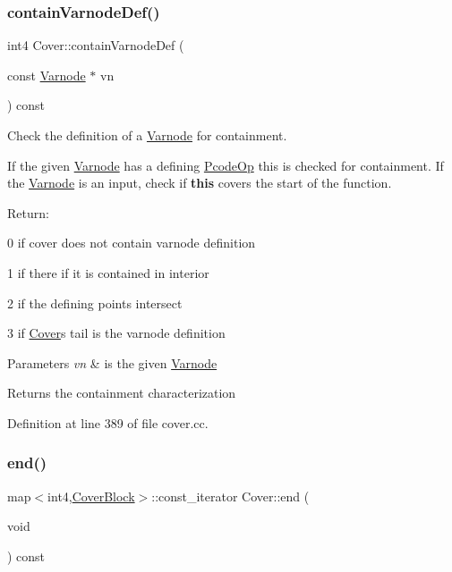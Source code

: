 \mbox{\label{class_cover_a56984085c138cc78b1544590d82fd872}} 
\subsubsection{\texorpdfstring{containVarnodeDef()}{containVarnodeDef()}}
{\footnotesize\ttfamily int4 Cover\+::contain\+Varnode\+Def (\begin{DoxyParamCaption}\item[{const \mbox{\hyperlink{class_varnode}{Varnode}} $\ast$}]{vn }\end{DoxyParamCaption}) const}



Check the definition of a \mbox{\hyperlink{class_varnode}{Varnode}} for containment. 

If the given \mbox{\hyperlink{class_varnode}{Varnode}} has a defining \mbox{\hyperlink{class_pcode_op}{Pcode\+Op}} this is checked for containment. If the \mbox{\hyperlink{class_varnode}{Varnode}} is an input, check if {\bfseries{this}} covers the start of the function.

Return\+:
\begin{DoxyItemize}
\item 0 if cover does not contain varnode definition
\item 1 if there if it is contained in interior
\item 2 if the defining points intersect
\item 3 if \mbox{\hyperlink{class_cover}{Cover}}\textquotesingle{}s tail is the varnode definition
\end{DoxyItemize}


\begin{DoxyParams}{Parameters}
{\em vn} & is the given \mbox{\hyperlink{class_varnode}{Varnode}} \\
\hline
\end{DoxyParams}
\begin{DoxyReturn}{Returns}
the containment characterization 
\end{DoxyReturn}


Definition at line 389 of file cover.\+cc.

\mbox{\label{class_cover_a6a39c4cbcb8855cbba7d756f09602aa6}} 
\subsubsection{\texorpdfstring{end()}{end()}}
{\footnotesize\ttfamily map$<$int4,\mbox{\hyperlink{class_cover_block}{Cover\+Block}}$>$\+::const\+\_\+iterator Cover\+::end (\begin{DoxyParamCaption}\item[{void}]{ }\end{DoxyParamCaption}) const\hspace{0.3cm}{\ttfamily [inline]}}



